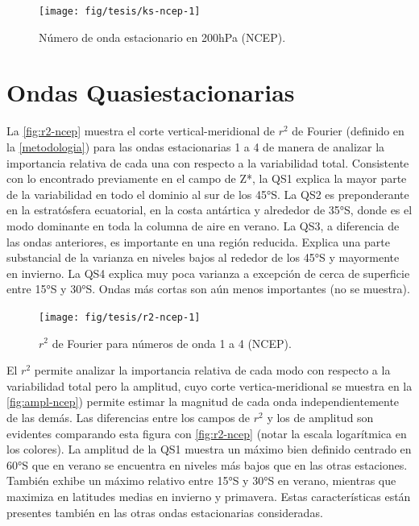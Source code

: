 \documentclass[spanish,a4paper,12pt,oneside]{book}
\begin{document}
\begin{landscape}\begin{figure}

{\centering \texttt{[image: fig/tesis/ks-ncep-1]} 

}

\caption{Número de onda estacionario en 200hPa (NCEP).}\label{fig:ks-ncep}
\end{figure}
\end{landscape}

\section{Ondas Quasiestacionarias}\label{ondas-quasiestacionarias}

La \autoref{fig:r2-ncep} muestra el corte vertical-meridional de \(r^2\)
de Fourier (definido en la \autoref{metodologia}) para las ondas
estacionarias 1 a 4 de manera de analizar la importancia relativa de
cada una con respecto a la variabilidad total. Consistente con lo
encontrado previamente en el campo de Z*, la QS1 explica la mayor parte
de la variabilidad en todo el dominio al sur de los 45°S. La QS2 es
preponderante en la estratósfera ecuatorial, en la costa antártica y
alrededor de 35°S, donde es el modo dominante en toda la columna de aire
en verano. La QS3, a diferencia de las ondas anteriores, es importante
en una región reducida. Explica una parte substancial de la varianza en
niveles bajos al rededor de los 45°S y mayormente en invierno. La QS4
explica muy poca varianza a excepción de cerca de superficie entre 15°S
y 30°S. Ondas más cortas son aún menos importantes (no se muestra).

\begin{landscape}\begin{figure}

{\centering \texttt{[image: fig/tesis/r2-ncep-1]} 

}

\caption{$r^2$ de Fourier para números de onda 1 a 4 (NCEP).}\label{fig:r2-ncep}
\end{figure}
\end{landscape}

El \(r^2\) permite analizar la importancia relativa de cada modo con
respecto a la variabilidad total pero la amplitud, cuyo corte
vertica-meridional se muestra en la \autoref{fig:ampl-ncep}) permite
estimar la magnitud de cada onda independientemente de las demás. Las
diferencias entre los campos de \(r^2\) y los de amplitud son evidentes
comparando esta figura con \autoref{fig:r2-ncep} (notar la escala
logarítmica en los colores). La amplitud de la QS1 muestra un máximo
bien definido centrado en 60°S que en verano se encuentra en niveles más
bajos que en las otras estaciones. También exhibe un máximo relativo
entre 15°S y 30°S en verano, mientras que maximiza en latitudes medias
en invierno y primavera. Estas características están presentes también
en las otras ondas estacionarias consideradas.
\end{document}
